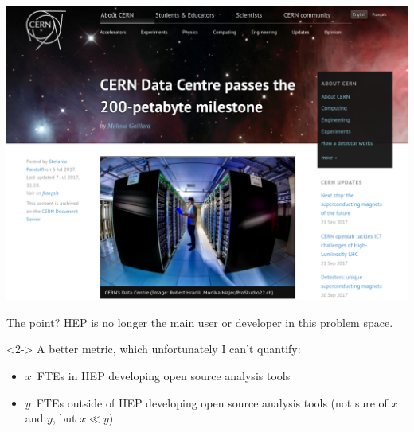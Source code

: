 \documentclass[aspectratio=169]{beamer}
\begin{document}
\begin{frame}{}
\vspace{0.35 cm}
\includegraphics[width=0.73\linewidth]{cern-200pb.png}

\vspace{-4.8 cm}
\end{frame}

\begin{frame}{The point?}
\Large
\vspace{0.5 cm}
HEP is no longer the main user or developer in this problem space.

\vspace{1 cm}
\begin{uncoverenv}<2->
A better metric, which unfortunately I can't quantify:
\begin{itemize}
\item $x$~FTEs in HEP developing open source analysis tools
\item $y$~FTEs outside of HEP developing open source analysis tools
(not sure of $x$ and $y$, but $x \ll y$)
\end{itemize}
\end{uncoverenv}

\vspace{0.5 cm}
\end{frame}
\end{document}
